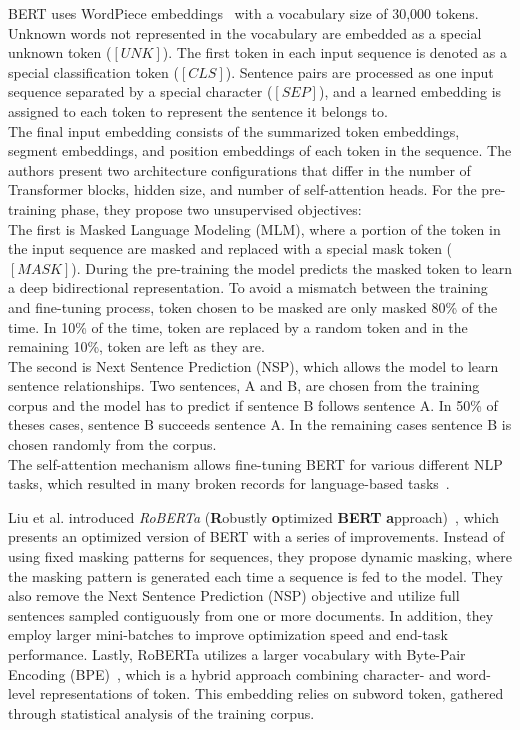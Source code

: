 BERT uses WordPiece embeddings~\cite{wu2016google} with a vocabulary size of 30,000 tokens. Unknown words not represented in the vocabulary are embedded as a special unknown token ($[UNK]$). The first token in each input sequence is denoted as a special classification token ($[CLS]$). Sentence pairs are processed as one input sequence separated by a special character ($[SEP]$), and a learned embedding is assigned to each token to represent the sentence it belongs to.\\
The final input embedding consists of the summarized token embeddings, segment embeddings, and position embeddings of each token in the sequence. The authors present two architecture configurations that differ in the number of Transformer blocks, hidden size, and number of self-attention heads.
For the pre-training phase, they propose two unsupervised objectives:\\
The first is Masked Language Modeling (MLM), where a portion of the token in the input sequence are masked and replaced with a special mask token ($[MASK]$). During the pre-training the model predicts the masked token to learn a deep bidirectional representation. To avoid a mismatch between the training and fine-tuning process, token chosen to be masked are only masked 80\% of the time. In 10\% of the time, token are replaced by a random token and in the remaining 10\%, token are left as they are.\\
The second is Next Sentence Prediction (NSP), which allows the model to learn sentence relationships. Two sentences, A and B, are chosen from the training corpus and the model has to predict if sentence B follows sentence A. In 50\% of theses cases, sentence B succeeds sentence A. In the remaining cases sentence B is chosen randomly from the corpus.\\
The self-attention mechanism allows fine-tuning BERT for various different NLP tasks, which resulted in many broken records for language-based tasks~\cite{sun2019fine,nogueira2019passage,zampieri2019semeval}.\par
Liu et al. introduced \textit{RoBERTa} (\textbf{R}obustly \textbf{o}ptimized \textbf{BERT} \textbf{a}pproach)~\cite{liu2019roberta}, which presents an optimized version of BERT with a series of improvements. Instead of using fixed masking patterns for sequences, they propose dynamic masking, where the masking pattern is generated each time a sequence is fed to the model. They also remove the Next Sentence Prediction (NSP) objective and utilize full sentences sampled contiguously from one or more documents. In addition, they employ larger mini-batches to improve optimization speed and end-task performance. Lastly, RoBERTa utilizes a larger vocabulary with Byte-Pair Encoding (BPE)~\cite{sennrich2016neural}, which is a hybrid approach combining character- and word-level representations of token. This embedding relies on subword token, gathered through statistical analysis of the training corpus.\par
